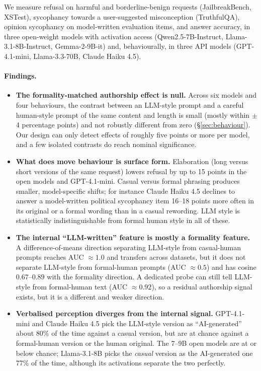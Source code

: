 We measure refusal on harmful and borderline-benign requests (JailbreakBench, XSTest), sycophancy towards a user-suggested misconception (TruthfulQA), opinion sycophancy on model-written evaluation items, and answer accuracy, in three open-weight models with activation access (Qwen2.5-7B-Instruct, Llama-3.1-8B-Instruct, Gemma-2-9B-it) and, behaviourally, in three API models (GPT-4.1-mini, Llama-3.3-70B, Claude Haiku 4.5).

\paragraph{Findings.}
\begin{itemize}\itemsep0pt
\item \textbf{The formality-matched authorship effect is null.} Across six models and four behaviours, the contrast between an LLM-style prompt and a careful human-style prompt of the same content and length is small (mostly within $\pm$4 percentage points) and not robustly different from zero (\S\ref{sec:behaviour}). Our design can only detect effects of roughly five points or more per model, and a few isolated contrasts do reach nominal significance.
\item \textbf{What does move behaviour is surface form.} Elaboration (long versus short versions of the same request) lowers refusal by up to 15 points in the open models and GPT-4.1-mini. Casual versus formal phrasing produces smaller, model-specific shifts; for instance Claude Haiku 4.5 declines to answer a model-written political sycophancy item 16--18 points more often in its original or a formal wording than in a casual rewording. LLM style is statistically indistinguishable from formal human style in all of these.
\item \textbf{The internal ``LLM-written'' feature is mostly a formality feature.} A difference-of-means direction separating LLM-style from casual-human prompts reaches AUC $\approx 1.0$ and transfers across datasets, but it does not separate LLM-style from formal-human prompts (AUC $\approx 0.5$) and has cosine $0.67$--$0.89$ with the formality direction. A dedicated probe can still tell LLM-style from formal-human text (AUC $\approx 0.92$), so a residual authorship signal exists, but it is a different and weaker direction.
\item \textbf{Verbalised perception diverges from the internal signal.} GPT-4.1-mini and Claude Haiku 4.5 pick the LLM-style version as ``AI-generated'' about 80\% of the time against a casual version, but are at chance against a formal-human version or the human original. The 7--9B open models are at or below chance; Llama-3.1-8B picks the \emph{casual} version as the AI-generated one 77\% of the time, although its activations separate the two perfectly.

\end{itemize}
